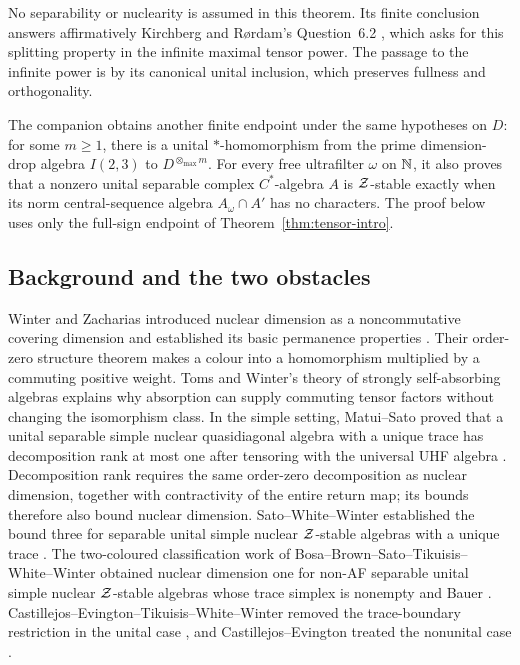 No separability or nuclearity is assumed in this theorem. Its finite
conclusion answers affirmatively Kirchberg and R\o rdam's
Question~6.2 \cite{KR}, which asks for this splitting property in the
infinite maximal tensor power. The passage to the infinite power is
by its canonical unital inclusion, which preserves fullness and
orthogonality.

The companion \cite[Theorems~1.1 and~1.2]{Fixed324} obtains another
finite endpoint under the same hypotheses on $D$: for some $m\ge1$,
there is a unital $*$-homomorphism from the prime dimension-drop algebra
$I(2,3)$ to $D^{\otimes_{\max}m}$. For every free ultrafilter $\omega$ on
$\mathbb N$, it also proves that a nonzero unital separable complex $C^*$-algebra
$A$ is $\mathcal Z$-stable exactly when its norm central-sequence algebra
$A_\omega\cap A'$ has no characters. The proof below uses only the full-sign
endpoint of Theorem~\ref{thm:tensor-intro}.

\subsection{Background and the two obstacles}

Winter and Zacharias introduced nuclear dimension as a noncommutative
covering dimension and established its basic permanence properties
\cite{WZNuclear}. Their order-zero structure theorem
\cite{WZOrderZero} makes a colour into a homomorphism multiplied by a
commuting positive weight. Toms and Winter's theory of strongly
self-absorbing algebras \cite{TW} explains why absorption can supply
commuting tensor factors without changing the isomorphism class.
In the simple setting, Matui--Sato proved that a unital separable simple
nuclear quasidiagonal algebra with a unique trace has decomposition rank
at most one after tensoring with the universal UHF algebra
\cite[Theorem~4.2]{MS}. Decomposition rank requires the same order-zero
decomposition as nuclear dimension, together with contractivity of the
entire return map; its bounds therefore also bound nuclear dimension.
Sato--White--Winter established the bound three
for separable unital simple nuclear $\mathcal Z$-stable algebras with a unique trace
\cite[Theorem~B]{SWW}. The two-coloured classification work of
Bosa--Brown--Sato--Tikuisis--White--Winter obtained nuclear dimension
one for non-AF separable unital simple nuclear $\mathcal Z$-stable algebras
whose trace simplex is nonempty and Bauer
\cite[Theorem~F]{BBSTWW}. Castillejos--Evington--Tikuisis--White--Winter
removed the trace-boundary restriction in the unital case
\cite[Theorem~B]{CETWW}, and Castillejos--Evington treated the
nonunital case \cite[Theorem~A]{CE}.

